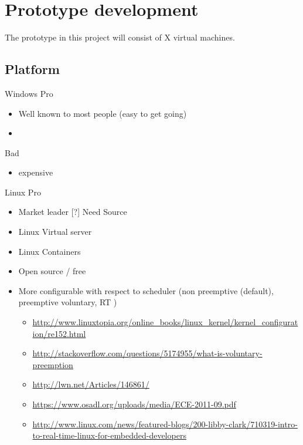 \chapter{Prototype development}
The prototype in this project will consist of X virtual machines.



\section{Platform}

Windows
Pro
\begin{itemize}
	\item Well known to most people (easy to get going) 
	\item 
\end{itemize}

Bad
\begin{itemize}
	\item expensive
\end{itemize}



Linux
Pro
\begin{itemize}
	\item Market leader [?] Need Source
	\item Linux Virtual server
	\item Linux Containers
	\item Open source / free
	\item More configurable with respect to scheduler (non preemptive (default), preemptive voluntary, RT ) 
	\begin{itemize}
		\item \url{http://www.linuxtopia.org/online_books/linux_kernel/kernel_configuration/re152.html}
		\item \url{http://stackoverflow.com/questions/5174955/what-is-voluntary-preemption}
		\item \url{http://lwn.net/Articles/146861/}
		\item \url{https://www.osadl.org/uploads/media/ECE-2011-09.pdf}
		\item \url{http://www.linux.com/news/featured-blogs/200-libby-clark/710319-intro-to-real-time-linux-for-embedded-developers}
								
	\end{itemize}
\end{itemize}




 



